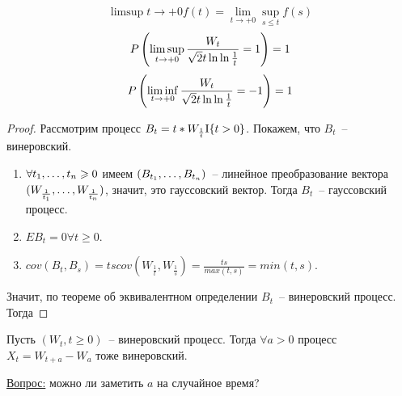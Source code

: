 \begin{corollary}
$$\limsup{t \to +0} f(t) = \lim_{t \to +0} \sup_{s \leq t} f(s)$$
$$P \left( \limsup_{t \to +0} \frac{W_t}{\sqrt 2t \ln \ln \frac{1}{t}} = 1 \right) = 1$$
$$P \left( \liminf_{t \to +0} \frac{W_t}{\sqrt 2t \ln \ln \frac{1}{t}} = -1 \right) = 1$$
\end{corollary}
\begin{proof}
Рассмотрим процесс $B_t = t*W_{\frac{1}{t}} \mathrm{I}\{ t>0 \}$. Покажем, что $B_t$~-- винеровский.

\begin{enumerate}
\item $\forall t_{1}, \dots, t_{n} \geqslant 0$ имеем $(B_{t_1}, \dots, B_{t_n})$~-- линейное преобразование вектора
$(W_{\frac{1}{t_1}}, \dots, W_{\frac{1}{t_n}})$, значит, это гауссовский вектор. Тогда $B_t$~--
гауссовский процесс.

\item $EB_t = 0 \forall t \geq 0$.

\item $cov(B_t, B_s) = t s cov(W_\frac{1}{t}, W_\frac{1}{s}) = \frac{ts}{max(t,s)} = min(t, s)$.
\end{enumerate}

Значит, по теореме об эквивалентном определении $B_t$~-- винеровский процесс. Тогда
\end{proof}

\begin{theorem}
Пусть $(W_t, t \geq 0)$~-- винеровский процесс. Тогда $\forall a > 0$ процесс
$X_t = W_{t+a} - W_a$ тоже винеровский.

\underline{Вопрос:} можно ли заметить $a$ на случайное время?
\end{theorem}


\ifdefined\Main\else

\fi

